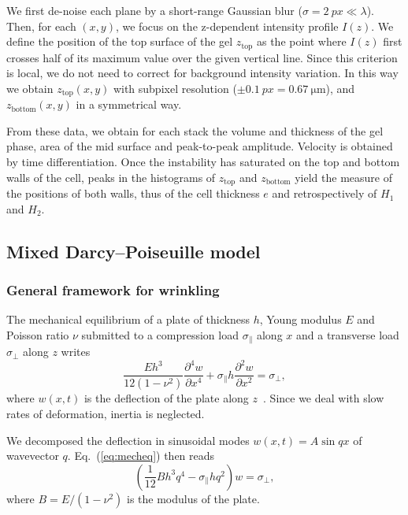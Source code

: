 \documentclass[twocolumn,superscriptaddress,showpacs,preprintnumbers,
amsmath,amssymb,prl]{revtex4-1}
\begin{document}
We first de-noise each plane by a short-range Gaussian blur ($\sigma=\SI{2}{px}\ll\lambda$). Then, for each $(x,y)$, we focus on the z-dependent intensity profile $I(z)$. We define the position of the top surface of the gel $z_\text{top}$ as the point where $I(z)$ first crosses half of its maximum value over the given vertical line. Since this criterion is local, we do not need to correct for background intensity variation. In this way we obtain $z_\text{top}(x,y)$ with subpixel resolution ($\pm\SI{0.1}{px}=\SI{0.67}{\micro\metre}$), and $z_\text{bottom}(x,y)$ in a symmetrical way.

From these data, we obtain for each stack the volume and thickness of the gel phase, area of the mid surface and peak-to-peak amplitude. Velocity is obtained by time differentiation. Once the instability has saturated on the top and bottom walls of the cell, peaks in the histograms of $z_\text{top}$ and $z_\text{bottom}$ yield the measure of the positions of both walls, thus of the cell thickness $e$ and retrospectively of $H_1$ and $H_2$.



\subsection*{Mixed Darcy--Poiseuille model}

\subsubsection*{General framework for wrinkling}

The mechanical equilibrium of a plate of thickness $h$, Young modulus $E$ and Poisson ratio $\nu$ submitted to a compression load $\sigma_\parallel$ along $x$ and a transverse load $\sigma_\perp$ along $z$ writes
\begin{equation}
\frac{E h^3}{12(1-\nu^2)}\frac{\partial^4 w}{\partial x^4} + \sigma_\parallel h \frac{\partial^2 w}{\partial x^2} = \sigma_\perp,
\label{eq:mecheq}
\end{equation}
where $w(x,t)$ is the deflection of the plate along $z$~\cite{Biot1957}. Since we deal with slow rates of deformation, inertia is neglected.

We decomposed the deflection in sinusoidal modes $w(x,t) =  A \sin qx$ of wavevector $q$. Eq.~(\ref{eq:mecheq}) then reads
\begin{equation}
\left(\frac{1}{12} B h^3 q^4 - \sigma_\parallel h q^2\right)w = \sigma_\perp,
\label{eq:mecheqop}
\end{equation}
where $B=E/(1-\nu^2)$ is the modulus of the plate.
\end{document}
